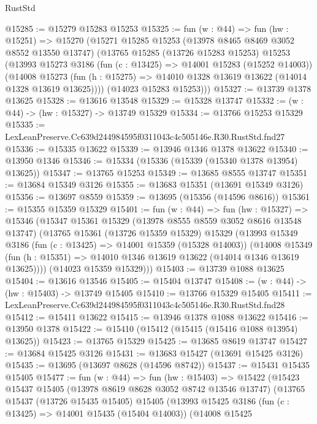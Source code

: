 \begin{lexlean}{RustStd}
\begin{coremodule}
@15285 := @15279 @15283 @15253
@15325 := fun (w : @44) =>
  fun (hw : @15251) =>
  @15270
    (@15271
      @15285
      @15253
      (@13978 @8465 @8469 @3052 @8552 @13550 @13747)
      (@13765
        @15285
        (@13726 @15283 @15253)
        @15253
        (@13993
          @15273
          @3186
          (fun (c : @13425) => @14001 @15283 (@15252 @14003))
          (@14008
            @15273
            (fun (h : @15275) => @14010 @1328 @13619 @13622 (@14014 @1328 @13619 @13625))))
        (@14023 @15283 @15253)))
@15327 := @13739 @1378 @13625
@15328 := @13616 @13548
@15329 := @15328 @13747
@15332 := (w : @44) -> (hw : @15327) -> @13749 @15329
@15334 := @13766 @15253 @15329
@15335 := LexLeanPreserve.Cc639d244984595f0311043c4c505146e.R30.RustStd.fnd27
@15336 := @15335 @13622
@15339 := @13946 @1346 @1378 @13622
@15340 := @13950 @1346
@15346 := @15334 (@15336 (@15339 (@15340 @1378 @13954) @13625))
@15347 := @13765 @15253
@15349 := @13685 @8555 @13747
@15351 := @13684 @15349 @3126
@15355 := @13683 @15351 (@13691 @15349 @3126)
@15356 := @13697 @8559
@15359 := @13695 (@15356 (@14596 @8616))
@15361 := @15355 @15359 @15329
@15401 := fun (w : @44) =>
  fun (hw : @15327) =>
  @15346
    (@15347
      @15361
      @15329
      (@13978 @8555 @8559 @3052 @8616 @13548 @13747)
      (@13765
        @15361
        (@13726 @15359 @15329)
        @15329
        (@13993
          @15349
          @3186
          (fun (c : @13425) => @14001 @15359 (@15328 @14003))
          (@14008
            @15349
            (fun (h : @15351) => @14010 @1346 @13619 @13622 (@14014 @1346 @13619 @13625))))
        (@14023 @15359 @15329)))
@15403 := @13739 @1088 @13625
@15404 := @13616 @13546
@15405 := @15404 @13747
@15408 := (w : @44) -> (hw : @15403) -> @13749 @15405
@15410 := @13766 @15329 @15405
@15411 := LexLeanPreserve.Cc639d244984595f0311043c4c505146e.R30.RustStd.fnd28
@15412 := @15411 @13622
@15415 := @13946 @1378 @1088 @13622
@15416 := @13950 @1378
@15422 := @15410 (@15412 (@15415 (@15416 @1088 @13954) @13625))
@15423 := @13765 @15329
@15425 := @13685 @8619 @13747
@15427 := @13684 @15425 @3126
@15431 := @13683 @15427 (@13691 @15425 @3126)
@15435 := @13695 (@13697 @8628 (@14596 @8742))
@15437 := @15431 @15435 @15405
@15477 := fun (w : @44) =>
  fun (hw : @15403) =>
  @15422
    (@15423
      @15437
      @15405
      (@13978 @8619 @8628 @3052 @8742 @13546 @13747)
      (@13765
        @15437
        (@13726 @15435 @15405)
        @15405
        (@13993
          @15425
          @3186
          (fun (c : @13425) => @14001 @15435 (@15404 @14003))
          (@14008
            @15425

\end{coremodule}
\end{lexlean}
